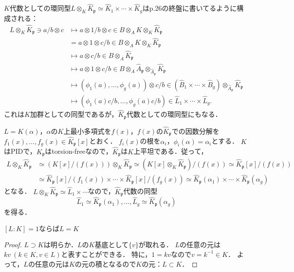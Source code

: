 $K$代数としての環同型$L\otimes_K\widehat{K}_\mathfrak{p}\simeq\widehat{K}_1\times\cdots\times\widehat{K}_g$はp.26の終盤に書いてるように構成される：
\begin{align*}
  L\otimes_K\widehat{K}_\mathfrak{p}\ni a/b\otimes c &\mapsto a\otimes1/b\otimes c\in B\otimes_AK\otimes_K\widehat{K}_\mathfrak{p}\\
  & =  a\otimes1\otimes c/b\in B\otimes_AK\otimes_K\widehat{K}_\mathfrak{p}\\
  &\mapsto a\otimes c/b\in B\otimes_A\widehat{K}_\mathfrak{p}\\
  &\mapsto a\otimes1\otimes c/b\in B\otimes_A\widehat{A}_\mathfrak{p}\otimes_{\widehat{A}_\mathfrak{p}}\widehat{K}_\mathfrak{p}\\
  &\mapsto (\phi_1(a), \ldots, \phi_g(a))\otimes c/b\in\left(\widehat{B}_1\times\cdots\times\widehat{B}_g\right)\otimes_{\widehat{A}_\mathfrak{p}}\widehat{K}_\mathfrak{p}\\
  &\mapsto (\phi_1(a)c/b, \ldots, \phi_g(a)c/b)\in\widehat{L}_1\times\cdots\times\widehat{L}_g.
\end{align*}
これは$K$加群としての同型であるが，$\widehat{K}_\mathfrak{p}$代数としての環同型にもなる．

$L = K(\alpha)$，$\alpha$の$K$上最小多項式を$f(x)$，$f(x)$の$\widehat{K}_\mathfrak{p}$での因数分解を$f_1(x), \ldots, f_g(x)\in\widehat{K}_\mathfrak{p}[x]$とおく．
$f_i(x)$の根を$\alpha_i$，$\phi_i(\alpha) = \alpha_i$とする．
$K$はPIDで，$K_\mathfrak{p}$はtorsion-freeなので，$\widehat{K}_\mathfrak{p}$は$K$上平坦である．従って，
\begin{align*}
  L\otimes_K\widehat{K}_\mathfrak{p} &\simeq \left(K[x]/(f(x))\right)\otimes_K\widehat{K}_\mathfrak{p} \simeq \left(K[x]\otimes_K\widehat{K}_\mathfrak{p}\right)/(f(x)) \simeq \widehat{K}_\mathfrak{p}[x]/(f(x)) \\
  &\simeq \widehat{K}_\mathfrak{p}[x]/(f_1(x))\times\cdots\times\widehat{K}_\mathfrak{p}[x]/(f_g(x)) \simeq \widehat{K}_\mathfrak{p}(\alpha_1)\times\cdots\times\widehat{K}_\mathfrak{p}(\alpha_g)
\end{align*}
となる．
$L\otimes_K\widehat{K}_\mathfrak{p}\simeq\widehat{L}_1\times\cdots$なので，$\widehat{K}_\mathfrak{p}$代数の同型
\[\widehat{L}_1\simeq\widehat{K}_\mathfrak{p}(\alpha_1), \ldots, \widehat{L}_g\simeq\widehat{K}_\mathfrak{p}(\alpha_g)\]
を得る．

\begin{screen}
  $[L:K] = 1$ならば$L = K$
\end{screen}
\begin{proof}
  $L\supset K$は明らか．$L$の$K$基底として$\{v\}$が取れる．
  $L$の任意の元は$kv\ (k\in K, v\in L)$と表すことができる．
  特に，$1 = kv$なので$v = k^{-1}\in K$．
  よって，$L$の任意の元は$K$の元の積となるので$K$の元：$L\subset K$．
\end{proof}

